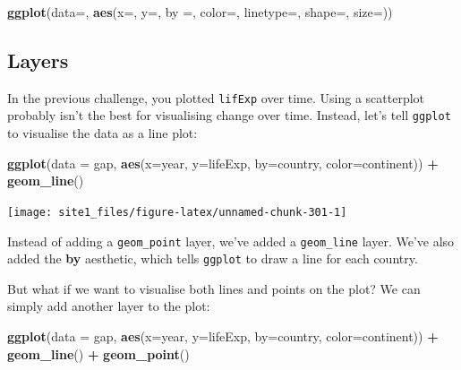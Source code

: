 \documentclass[]{book}
\newenvironment{Shaded}{\begin{snugshade}}{\end{snugshade}}
\newcommand{\DataTypeTok}[1]{\textcolor[rgb]{0.13,0.29,0.53}{#1}}
\newcommand{\KeywordTok}[1]{\textcolor[rgb]{0.13,0.29,0.53}{\textbf{#1}}}
\newcommand{\NormalTok}[1]{#1}
\newcommand{\OperatorTok}[1]{\textcolor[rgb]{0.81,0.36,0.00}{\textbf{#1}}}
\newcommand{\StringTok}[1]{\textcolor[rgb]{0.31,0.60,0.02}{#1}}
\begin{document}
\begin{Shaded}
\begin{Highlighting}[]
\KeywordTok{ggplot}\NormalTok{(}\DataTypeTok{data=}\NormalTok{, }\KeywordTok{aes}\NormalTok{(}\DataTypeTok{x=}\NormalTok{, }\DataTypeTok{y=}\NormalTok{, }\DataTypeTok{by =}\NormalTok{, }\DataTypeTok{color=}\NormalTok{, }\DataTypeTok{linetype=}\NormalTok{, }\DataTypeTok{shape=}\NormalTok{, }\DataTypeTok{size=}\NormalTok{))}
\end{Highlighting}
\end{Shaded}

\hypertarget{layers}{%
\subsection{Layers}\label{layers}}

In the previous challenge, you plotted \texttt{lifExp} over time. Using a scatterplot probably isn't the best for visualising change over time. Instead, let's tell \texttt{ggplot} to visualise the data as a line plot:

\begin{Shaded}
\begin{Highlighting}[]
\KeywordTok{ggplot}\NormalTok{(}\DataTypeTok{data =}\NormalTok{ gap, }\KeywordTok{aes}\NormalTok{(}\DataTypeTok{x=}\NormalTok{year, }\DataTypeTok{y=}\NormalTok{lifeExp, }\DataTypeTok{by=}\NormalTok{country, }\DataTypeTok{color=}\NormalTok{continent)) }\OperatorTok{+}\StringTok{ }
\StringTok{  }\KeywordTok{geom_line}\NormalTok{()}
\end{Highlighting}
\end{Shaded}

\begin{center}\texttt{[image: site1\_files/figure-latex/unnamed-chunk-301-1]} \end{center}

Instead of adding a \texttt{geom\_point} layer, we've added a \texttt{geom\_line} layer. We've also added the \textbf{by} aesthetic, which tells \texttt{ggplot} to draw a line for each country.

But what if we want to visualise both lines and points on the plot? We can simply add another layer to the plot:

\begin{Shaded}
\begin{Highlighting}[]
\KeywordTok{ggplot}\NormalTok{(}\DataTypeTok{data =}\NormalTok{ gap, }\KeywordTok{aes}\NormalTok{(}\DataTypeTok{x=}\NormalTok{year, }\DataTypeTok{y=}\NormalTok{lifeExp, }\DataTypeTok{by=}\NormalTok{country, }\DataTypeTok{color=}\NormalTok{continent)) }\OperatorTok{+}\StringTok{ }
\StringTok{  }\KeywordTok{geom_line}\NormalTok{() }\OperatorTok{+}\StringTok{ }
\StringTok{  }\KeywordTok{geom_point}\NormalTok{()}
\end{Highlighting}
\end{Shaded}
\end{document}
